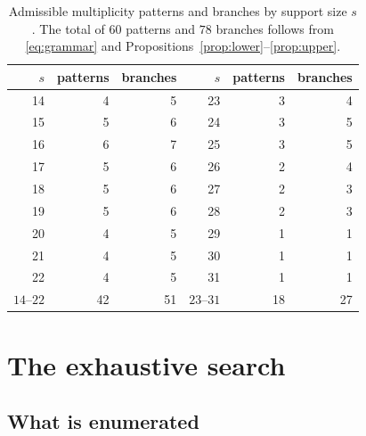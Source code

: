 \documentclass[11pt]{article}
\theoremstyle{definition}
\theoremstyle{remark}
\begin{document}
\begin{table}[htbp]
\centering
\caption{Admissible multiplicity patterns and branches by support size $s$. The total of $60$ patterns and $78$ branches follows from \eqref{eq:grammar} and Propositions~\ref{prop:lower}--\ref{prop:upper}.}
\label{tab:counts}
\small
\begin{tabular}{@{}rrr@{\qquad}rrr@{}}
\toprule
$s$ & patterns & branches & $s$ & patterns & branches\\
\midrule
14 & 4 & 5 & 23 & 3 & 4\\
15 & 5 & 6 & 24 & 3 & 5\\
16 & 6 & 7 & 25 & 3 & 5\\
17 & 5 & 6 & 26 & 2 & 4\\
18 & 5 & 6 & 27 & 2 & 3\\
19 & 5 & 6 & 28 & 2 & 3\\
20 & 4 & 5 & 29 & 1 & 1\\
21 & 4 & 5 & 30 & 1 & 1\\
22 & 4 & 5 & 31 & 1 & 1\\
\midrule
$14$--$22$ & 42 & 51 & $23$--$31$ & 18 & 27\\
\bottomrule
\end{tabular}
\end{table}

\section{The exhaustive search}\label{sec:search}

\subsection{What is enumerated}\label{subsec:enumeration}
\end{document}

